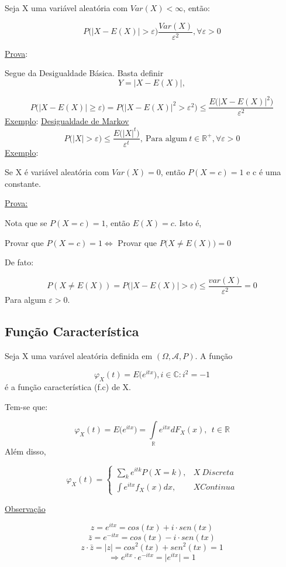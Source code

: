 \documentclass[a4paper,12pt]{article}
\begin{document}
\begin{enumerate}
\begin{itemize}
Seja X uma variável aleatória com $Var(X)<\infty$, então:

$$P\bigg(|X-E(X)|>\varepsilon\bigg)  \frac{Var(X)}{\varepsilon^2}, \forall \varepsilon>0$$

\underline{Prova}:

Segue da Desigualdade Básica. Basta definir 
$$Y=|X-E(X)|, $$

$$P\bigg(|X-E(X)|\ge \varepsilon\bigg) = P\bigg(
|X-E(X)|^2 > \varepsilon^2
\bigg)\le \frac{E\bigg(|X-E(X)|^2\bigg)}{\varepsilon^2} $$
\underline{Exemplo}:
\underline{Desigualdade de Markov}
$$P\bigg(
|X|>\varepsilon
\bigg)
\le \frac{E\bigg(|X|^t\bigg)}{\varepsilon^t}, \ \text{Para algum} \ t\in \mathbb R^+,\forall \varepsilon>0
 $$
\newpage 
\underline{Exemplo}:

Se X é variável aleatória com $Var(X)=0$, então $P(X=c)=1$ e c é uma constante.

\underline{Prova:}

Nota que se $P(X=c)=1$, então $E(X)=c$. Isto é, 

Provar que $P(X=c)=1 \Leftrightarrow $ Provar que $P\bigg(X\ne E(X)\bigg)=0$ 

De fato:

$$P(X\ne E(X)) = P\bigg(
|X-E(X)| > \varepsilon
\bigg)
\le 
\frac{var(X)}{\varepsilon^2}=0
 $$
Para algum $\varepsilon>0$.

\newpage

\subsection{Função Característica}

Seja X uma varável aleatória definida em $(\Omega,\mathscr{A},P)$. A função

$$\varphi_X(t) = E\bigg(
e^{itx}
\bigg), i \in \mathbb C : i^2=-1$$
é a função característica (f.c) de X.

Tem-se que:

$$\varphi_X(t) = E\bigg(
e^{itx}\bigg)= \int\limits_{\mathbb R} e^{itx}dF_X(x), \ \ t\in \mathbb R$$
Além disso,

$$
\varphi_X(t)=\begin{cases}
\sum\limits_k e^{itk} P(X=k), & X \ Discreta\\
\int e^{itx}f_X(x)dx, & X Continua
\end{cases}
$$

\underline{Observação}

$$z=e^{itx} = cos(tx) + i\cdot sen(tx) $$
$$\bar z = e^{-itx} = cos(tx)- i\cdot sen(tx) $$
$$z\cdot \bar z = |z| = cos^2(tx)+sen^2(tx) = 1 $$
$$\Rightarrow e^{itx}\cdot e^{-itx} = \bigg|
e^{itx}
\bigg|=1 $$


\end{itemize}
\end{enumerate}
\end{document}
